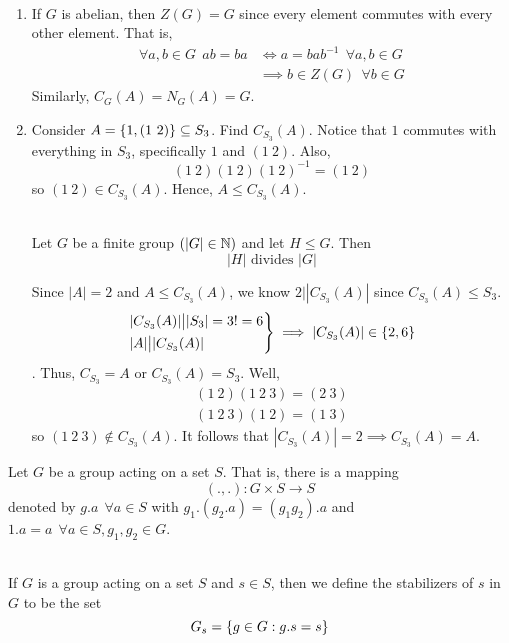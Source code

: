 \begin{fact} \leavevmode \\
    \begin{enumerate}
        \item If $G$ is abelian, then $Z(G) = G$ since every element commutes with every other element. That is,
        \begin{align*}
        \forall a,b \in G ~~ab = ba &\iff a = bab^{-1} ~~ \forall a,b \in G \\ &\implies b \in Z(G) ~~\forall b \in G
        \end{align*}
        Similarly, $C_G(A) = N_G(A) = G.$
        \item Consider $A=\left\{1, (1 ~2)\right\} \subseteq S_3$. Find $C_{S_3}(A)$. Notice that $1$ commutes with everything in $S_3$, specifically $1$ and $(1~2)$. Also,
        $$(1~2)(1~2)(1~2)^{-1} = (1~2)$$
        so $(1~2)\in C_{S_3}(A)$. Hence, $A \leq C_{S_3}(A)$.
        \begin{theorem} \leavevmode \\
            Let $G$ be a finite group $\left(|G| \in \mathbb{N}\right)$ and let $H \leq G$. Then
            $$|H| \text{ divides } |G|$$
        \end{theorem}
        Since $|A| = 2$ and $A \leq C_{S_3}(A)$, we know $2 \big| |C_{S_3}(A)|$ since $C_{S_3}(A) \leq S_3$.
        $$
        \begin{rcases*}
            |C_{S_3}(A)| \big| |S_3| = 3! = 6 \\
            |A| \big| |C_{S_3}(A)|
        \end{rcases*} \implies |C_{S_3}(A)| \in \set{2, 6}$$.
        Thus, $C_{S_3}= A$ or $C_{S_3}(A) = S_3$. Well,
        \begin{align*}
            (1~2)(1~2~3) = (2~3) \\
            (1~2~3)(1~2) = (1~3)
        \end{align*}
        so $(1~2~3) \not \in C_{S_3}(A)$. It follows that $|C_{S_3}(A)| = 2 \implies C_{S_3}(A) = A.$
    \end{enumerate}
\end{fact}

Let $G$ be a group acting on a set $S$. That is, there is a mapping
$$(., .): G\times S \to S$$
denoted by $g.a ~~\forall a \in S$ with $g_1.(g_2.a) = (g_1g_2).a$ and $1.a = a ~~\forall a \in S, g_1,g_2 \in G$.

\begin{definition} [Stabilizers] \leavevmode \\
    If $G$ is a group acting on a set $S$ and $s \in S$, then we define the stabilizers of $s$ in $G$ to be the set 
    $$G_s = \left\{g \in G : g.s = s\right\}$$
\end{definition}

